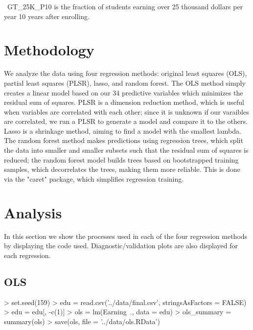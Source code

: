 \documentclass{article}
\begin{document}
\textbullet\ GT\_25K\_P10 is the fraction of students earning over 25 thousand dollars per year 10 years after enrolling.


\section{Methodology}

We analyze the data using four regression methods: original least squares (OLS), partial least squares (PLSR), lasso, and random forest. The OLS method simply creates a linear model based on our 34 predictive variables which minimizes the residual sum of squares. PLSR is a dimension reduction method, which is useful when variables are correlated with each other; since it is unknown if our varaibles are correlated, we run a PLSR to generate a model and compare it to the others. Lasso is a shrinkage method, aiming to find a model with the smallest lambda. The random forest method makes predictions using regression trees, which split the data into smaller and smaller subsets such that the residual sum of squares is reduced; the random forest model builds trees based on bootstrapped training samples, which decorrelates the trees, making them more reliable. This is done via the "caret" package, which simplifies regression training.



\section{Analysis}

In this section we show the processes used in each of the four regression methods by displaying the code used. Diagnostic/validation plots are also displayed for each regression.

\subsection{OLS}

\begin{Schunk}
\begin{Sinput}
> set.seed(159)
> edu = read.csv('../data/final.csv', stringsAsFactors = FALSE)
> edu = edu[, -c(1)]
> ols = lm(Earning~., data = edu)
> ols_summary = summary(ols)
> save(ols, file = '../data/ols.RData')
\end{Sinput}
\end{Schunk}
\end{document}
